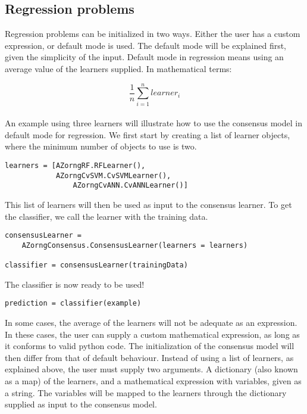\documentclass[12pt]{article}
\begin{document}
\subsection{Regression problems}

Regression problems can be initialized in two ways. Either the user has a custom
expression, or default mode is used. The default mode will be explained first, given
the simplicity of the input. Default mode in regression means using an average value
of the learners supplied. In mathematical terms:

\begin{equation}
  \frac{1}{n} \sum_{i=1}^n learner_i
\end{equation}
\\

An example using three learners will illustrate how to use the consensus model in 
default mode for regression. We first start by creating a list of learner objects,
where the minimum number of objects to use is two.

\begin{verbatim}
learners = [AZorngRF.RFLearner(), 
            AZorngCvSVM.CvSVMLearner(),
	            AZorngCvANN.CvANNLearner()]
\end{verbatim}

This list of learners will then be used as input to the consensus learner. To get
the classifier, we call the learner with the training data.

\begin{verbatim}
consensusLearner = 
    AZorngConsensus.ConsensusLearner(learners = learners)

classifier = consensusLearner(trainingData)
\end{verbatim}

The classifier is now ready to be used! 

\begin{verbatim}
prediction = classifier(example)
\end{verbatim}

\newpage
In some cases, the average of the learners will not be adequate as an expression.
In these cases, the user can supply a custom mathematical expression, as long
as it conforms to valid python code. The initialization of the consensus model will
then differ from that of default behaviour. Instead of using a list of learners,
as explained above, the user must supply two arguments. A dictionary (also known
as a map) of the learners, and a mathematical expression with variables, given as a string.
The variables will be mapped to the learners through the dictionary supplied as
input to the consensus model.
\end{document}
